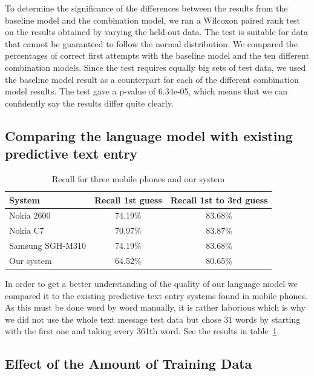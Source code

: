 \documentclass[a4paper,conference]{IEEEtran}
\begin{document}
To determine the significance of the differences between the results
from the baseline model and the combination model, we ran a Wilcoxon
paired rank test on the results obtained by varying the held-out
data. The test is suitable for data that cannot be guaranteed to
follow the normal distribution. We compared the percentages of correct
first attempts with the baseline model and the ten different
combination models. Since the test requires equally big sets of test
data, we used the baseline model result as a counterpart for each of
the different combination model results. The test gave a p-value of
6.34e-05, which means that we can confidently say the results
differ quite clearly.

\subsection{Comparing the language model with existing predictive text entry}

\begin{table}[!t]
\begin{center}
\caption{Recall for three mobile phones and our system}
\label{tab:phones}
\begin{tabular} {l c c}
System & Recall 1st guess & Recall 1st to 3rd guess\\
\hline
Nokia 2600 \rule{0pt}{2.6ex}  & 74.19\%          & 83.68\%\\
Nokia C7     & 70.97\%          & 83.87\%\\
Samsung SGH-M310 & 74.19\%      & 83.68\%\\
Our system & 64.52\% & 80.65\%  \\
\hline
\end{tabular}
\end{center}
\end{table}

In order to get a better understanding of the quality of our language
model we compared it to the existing predictive text entry systems
found in mobile phones. As this must be done word by word manually, it
is rather laborious which is why we did not use the whole text message
test data but chose 31 words by starting with the first one and taking
every 361th word. See the results in table~\ref{tab:phones}.

\subsection{Effect of the Amount of Training Data}
\end{document}
